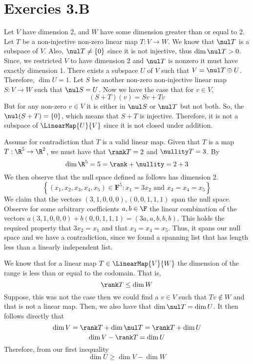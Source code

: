 

\section{Exercies 3.B}
\begin{q}[7]
    Let $ V $ have dimension 2, and $ W $ have some dimension greater than or equal to 2. 
    Let $ T $ be a non-injective non-zero linear map $ T: V \to W $. 
    We know that $ \nul T $ is a subspace of $ V $. 
    Also, $ \nul T \neq \{0\} $ since it is not injective, 
    thus $ \dim \nul T > 0 $. 
    Since, we restricted $ V $ to have dimension 2 and $ \nul T $ is nonzero it must have exactly dimension 1. 
    There exists a subspace $ U $ of $ V $ such that $ V = \nul T \oplus U $. 
    Therefore, $ \dim U = 1 $.
    Let $ S $ be another  non-zero non-injective linear map $ S : V \to W $ such that $ \nul S = U $. 
    Now we have the case that for $ v \in V $, 
    $$ (S + T)(v) = Sv + Tv $$
    But for any non-zero $ v \in V $ it is either in $ \nul S $ or $ \nul T $ but not both. 
    So, the $ \nul (S + T) = \{0\} $, which means that $ S + T $ is injective. 
    Therefore, it is not a subspace of $ \LinearMap{U}{V} $ since it is not closed under addition.
\end{q}

\begin{q}[15]
    Assume for contradiction that $ T $ is a valid linear map. 
    Given that $ T $ is a map $ T: \R^5 \to \R^2$, we must have that $ \rank T = 2 $ and $ \nullity T = 3 $. 
    By 
    $$ \dim \R^5 = 5 = \rank + \nullity = 2 + 3 $$
    We then observe that the null space defined as follows
    has dimension 2. 
    $$\left\{\left(x_{1}, x_{2}, x_{3}, x_{4}, x_{5}\right) \in \mathbf{F}^{5}: x_{1}=3 x_{2} \text { and } x_{3}=x_{4}=x_{5}\right\}$$
    We claim that the vectors $ (3, 1, 0, 0, 0), (0, 0, 1, 1, 1) $ span the null space. 
    Observe for some arbitrary coefficients $ a, b \in \F $ the linear combination of the vectors 
    $ a(3, 1, 0, 0, 0) + b(0, 0, 1, 1, 1) = (3a, a, b, b, b)$. 
    This holds the required property that $ 3x_2 = x_1 $ and that $ x_3 = x_4 = x_5 $. 
    Thus, it spans our null space and we have a contradiction, since we found a spanning list that has length less than a linearly independent list.  
\end{q}

\begin{q}[19]
    We know that for a linear map $ T \in \LinearMap{V}{W} $ the dimension of the range is less than or equal to the codomain.
    That is, 
    $$ \rank T \leq \dim W $$
    Suppose, this was not the case then we could find a $ v \in V $ such that $ Tv \not \in W $ and that is not a linear map. 
    Then, we also have that $ \dim \nul T = \dim U $. 
    It then follows directly that 
    $$ \dim V = \rank T + \dim \nul T = \rank T + \dim U $$
    $$ \dim V - \rank T = \dim U $$
    Therefore, from our first inequality 
    $$ \dim U \geq \dim V - \dim W $$
\end{q}

